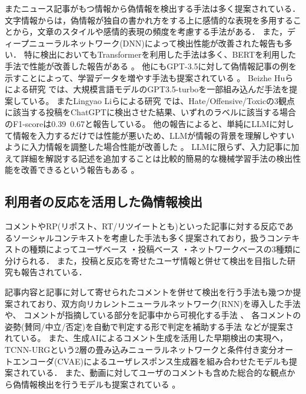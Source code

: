 またニュース記事がもつ情報から偽情報を検出する手法は多く提案されている．
文字情報からは，偽情報が独自の書かれ方をする上に感情的な表現を多用することから，文章のスタイル\cite{potthast-etal-2018-stylometric}や感情的表現の頻度\cite{DBLP:journals/corr/abs-1903-01728}を考慮する手法がある．
また，ディープニューラルネットワーク(DNN)によって検出性能が改善された報告\cite{wang-2017-liar,karimi-tang-2019-learning,karimi-etal-2018-multi}も多い．
特に検出においてもTransformerを利用した手法は多く、BERTを利用した手法で性能が改善した報告がある \cite{Kaliyar2021,yanagi2021classifying}。
他にもGPT-3.5に対して偽情報記事の例を示すことによって、学習データを増やす手法も提案されている \cite{lucas-etal-2023-fighting}。
Beizhe Huらによる研究 \cite{Hu_Sheng_Cao_Shi_Li_Wang_Qi_2024}では、大規模言語モデルのGPT3.5-turboを一部組み込んだ手法を提案している。
またLingyao Liらによる研究 \cite{10.1145/3643829}では、Hate/Offensive/Toxicの3観点に該当する投稿をChatGPTに検出させた結果、いずれのラベルに該当する場合のF1-scoreは0.39~0.67と報告している。
他の報告によると、単純にLLMに対して情報を入力するだけでは性能が悪いため、LLMが情報の背景を理解しやすいように入力情報を調整した場合性能が改善した \cite{doi:10.1137/1.9781611978032.50}。
LLMに限らず、入力記事に加えて詳細を解説する記述を追加することは比較的簡易的な機械学習手法の検出性能を改善できるという報告もある \cite{Bonet-Jover2024}。

\subsection{利用者の反応を活用した偽情報検出}
コメントやRP(リポスト、RT/リツイートとも)といった記事に対する反応であるソーシャルコンテキストを考慮した手法も多く提案されており，扱うコンテキストの種類によってユーザベース\cite{Castillo:2011:ICT:1963405.1963500,8397048,DBLP:journals/corr/abs-1904-13355}
・投稿ベース\cite{Yang_Shu_Wang_Gu_Wu_Liu_2019,Tacchini2017SomeLI,Jin:2016:NVE:3016100.3016318}
・ネットワークベース\cite{Wu:2018:TFF:3159652.3159677,DBLP:journals/corr/abs-1902-06673}の3種類に分けられる．
また，投稿と反応を寄せたユーザ情報と併せて検出を目指した研究も報告されている\cite{10.1145/3386253}．

記事内容と記事に対して寄せられたコメントを併せて検出を行う手法も幾つか提案されており、双方向リカレントニューラルネットワーク(RNN)を導入した手法や\cite{https://doi.org/10.1049/ise2.12021}、
コメントが指摘している部分を記事中から可視化する手法 \cite{10.1145/3292500.3330935}、
各コメントの姿勢(賛同/中立/否定)を自動で判定する形で判定を補助する手法 \cite{9414787} などが提案されている。
また、生成AIによるコメント生成を活用した早期検出の実現へ，TCNN-URGという2層の畳み込みニューラルネットワークと条件付き変分オートエンコーダ(CVAE)によるユーザレスポンス生成器を組み合わせたモデルも提案されている\cite{ijcai2018-533}．
また、動画に対してユーザのコメントも含めた総合的な観点から偽情報検出を行うモデルも提案されている \cite{zong-etal-2024-unveiling}。

